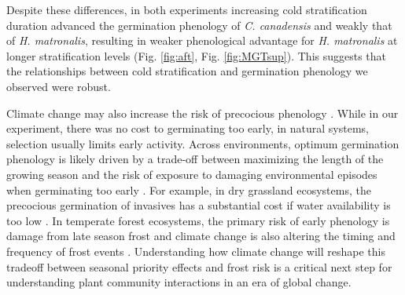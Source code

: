 \documentclass{article}[11pt]
\begin{document}
Despite these differences, in both experiments increasing cold stratification duration advanced the germination phenology of \textit{C. canadensis} and weakly that of \textit{H. matronalis}, resulting in weaker phenological advantage for \textit{H. matronalis} at longer stratification levels (Fig. \ref{fig:aft}, Fig.  \ref{fig:MGTsup}). This suggests that the relationships between cold stratification and germination phenology we observed were robust. 

Climate change may also increase the risk of precocious phenology \citep{Inouye:2000ud}. While in our experiment, there was no cost to germinating too early, in natural systems, selection usually limits early activity. Across environments, optimum germination phenology is likely driven by a trade-off between maximizing the length of the growing season and the risk of exposure to damaging environmental episodes when germinating too early \citep{Augspurger:2017vu}. For example, in dry grassland ecosystems, the precocious germination of invasives has a substantial cost if water availability is too low \citep{Wainwright_2011}. In temperate forest ecosystems, the primary risk of early phenology is damage from late season frost \citep{Kollas:2014vn} and climate change is also altering the timing and frequency of frost events \citep{Ma:2019uf}. Understanding how climate change will reshape this tradeoff between seasonal priority effects and frost risk is a critical next step for understanding plant community interactions in an era of global change. 
\end{document}
